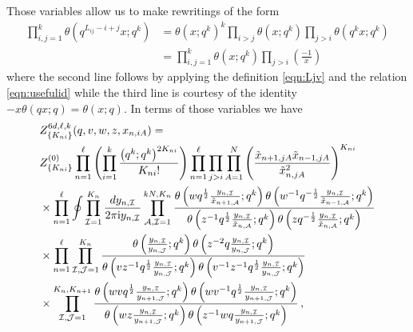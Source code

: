 \documentclass[main.tex]{subfiles}
\begin{document}
Those variables allow us to make rewritings of the form
\begin{align}
\prod_{i,j=1}^k\theta\left(q^{L_{ij}-i+j}x;q^k\right)
&=\theta\left(x;q^k\right)^k\prod_{i>j}\theta\left(x;q^k\right)\prod_{j>i}\theta\left(q^{k}x;q^k\right)\\
&=\prod_{i,j=1}^k\theta\left(x;q^k\right)\prod_{j>i}\left(\frac{-1}{x}\right)
\end{align}
where the second line follows by applying the definition \eqref{eqn:Ljv} and the relation \eqref{eqn:usefulid} while the third line is courtesy of the identity $-x\theta\left(qx;q\right)=\theta\left(x;q\right)$. In terms of those variables we have
\begin{equation}
\begin{aligned}\label{eqn:lkmnpartfnrewrite}
&Z^{6d,\ell,k}_{\{K_{ni}\}}(q,v,w,z,x_{n,iA})=\\
&Z^{(0)}_{\{K_{ni}\}}\prod_{n=1}^{\ell}\left(\prod_{i=1}^k\frac{\left(q^k;q^k\right)^{2K_{ni}}}{K_{ni}!}\right)\prod_{n=1}^{\ell}\prod_{j>i}\prod_{A=1}^N\left(\frac{\tilde{x}_{n+1,jA}\tilde{x}_{n-1,jA}}{\tilde{x}_{n,jA}^2}\right)^{K_{ni}}\\
&\times\prod_{n=1}^{\ell}\oint\prod_{\mathcal{I}=1}^{K_{n}}\frac{dy_{n,\mathcal{I}}}{2\pi\mathrm{i} y_{n,\mathcal{I}}}\prod_{\mathcal{A},\mathcal{I}=1}^{kN,K_n}\frac{\theta\left(wq^{\frac{1}{2}}\frac{y_{n,\mathcal{I}}}{\tilde{x}_{n+1,\mathcal{A}}};q^k\right)\theta\left(w^{-1}q^{-\frac{1}{2}}\frac{y_{n,\mathcal{I}}}{\tilde{x}_{n-1,\mathcal{A}}};q^k\right)}{\theta\left(z^{-1}q^{\frac{1}{2}}\frac{y_{n,\mathcal{I}}}{\tilde{x}_{n,\mathcal{A}}};q^k\right)\theta\left(zq^{-\frac{1}{2}}\frac{y_{n,\mathcal{I}}}{\tilde{x}_{n,\mathcal{A}}};q^k\right)}\\
&\times\prod_{n=1}^{\ell}\prod_{\mathcal{I},\mathcal{J}=1}^{K_{n}}\frac{\theta\left(\frac{y_{n,\mathcal{I}}}{y_{n,\mathcal{J}}};q^k\right)\theta\left(z^{-2}q\frac{y_{n,\mathcal{I}}}{y_{n,\mathcal{J}}};q^k\right)}{\theta\left(vz^{-1}q^{\frac{1}{2}}\frac{y_{n,\mathcal{I}}}{y_{n,\mathcal{J}}};q^k\right)\theta\left(v^{-1}z^{-1}q^{\frac{1}{2}}\frac{y_{n,\mathcal{I}}}{y_{n,\mathcal{J}}};q^k\right)}\\
&\times\prod_{\mathcal{I},\mathcal{J}=1}^{K_n,K_{n+1}}\frac{\theta\left(wvq^{\frac{1}{2}}\frac{y_{n,\mathcal{I}}}{y_{n+1,\mathcal{J}}};q^k\right)\theta\left(wv^{-1}q^{\frac{1}{2}}\frac{y_{n,\mathcal{I}}}{y_{n+1,\mathcal{J}}};q^k\right)}{\theta\left(wz\frac{y_{n,\mathcal{I}}}{y_{n+1,\mathcal{J}}};q^k\right)\theta\left(z^{-1}wq\frac{y_{n,\mathcal{I}}}{y_{n+1,\mathcal{J}}};q^k\right)}\,,
\end{aligned}
\end{equation}
\end{document}
